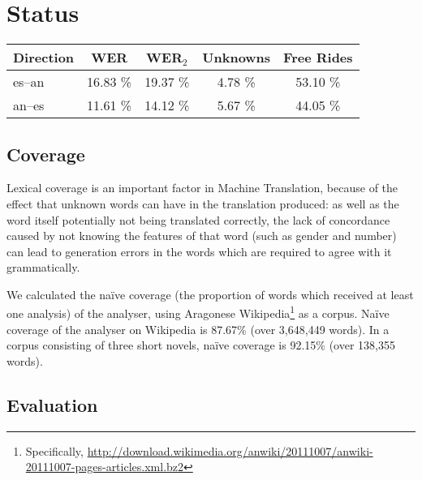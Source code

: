 \documentclass[10pt, a4paper]{article}
\begin{document}
  \section{Status}
  
  \begin{table*}
  \centering
  \begin{tabular}{|l|c|c|c|c|}
  \hline
  Direction    & WER & WER$_2$ & Unknowns & Free Rides\\
  \hline
  es--an        & 16.83 \% & 19.37 \%  & 4.78 \% & 53.10 \% \\
  an--es        & 11.61 \% & 14.12 \%  & 5.67 \% & 44.05 \% \\
  \hline
  \end{tabular}
    \caption{Evaluation results for both directions. Free rides are those unknown words which
       are identical in both the source and target language. Although they do not cause
       a degradation in translation quality, it is relevant to take them into account when
       evaluating the system. Unknown words are included as an indication of naïve coverage
       over the test sets.
       For brevity, we refer to the languages by their ISO 639-1 codes: {\tt es} for Spanish, and {\tt an} for Aragonese.}
    \label{table:quanteval}
  \end{table*}
  
  \subsection{Coverage}
  
  Lexical coverage is an important factor in Machine Translation, because of the effect that unknown words can have in the translation produced: as well as the word itself potentially not being translated correctly, the lack of concordance caused by not knowing the features of that word (such as gender and number) can lead to generation errors in the words which are required to agree with it grammatically.
  
We calculated the naïve coverage (the proportion of words which received at least one analysis) of the analyser, using Aragonese Wikipedia\footnote{Specifically, \url{http://download.wikimedia.org/anwiki/20111007/anwiki-20111007-pages-articles.xml.bz2}} as a corpus. Naïve coverage of the analyser on Wikipedia is 87.67\% (over 3,648,449 words).  In a corpus consisting of three short novels, naïve coverage is 92.15\% (over 138,355 words).
  
  \subsection{Evaluation}
  
\end{document}
